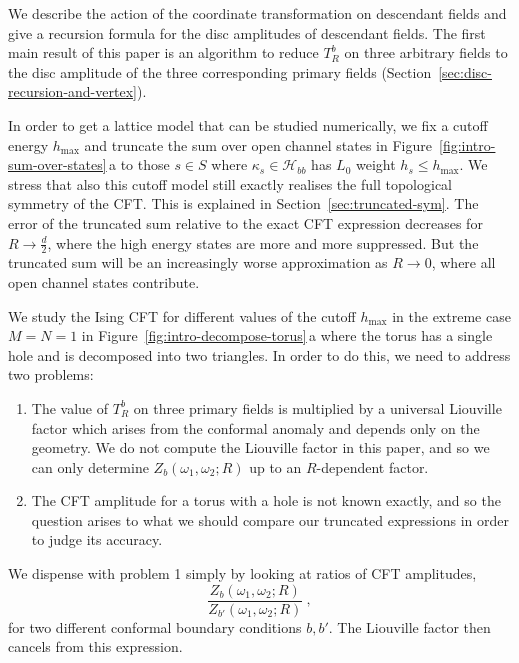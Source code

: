 \documentclass[11pt,a4paper]{article}
\numberwithin{equation}{section}
\begin{document}
We describe the action of the coordinate transformation on descendant fields and 
give a recursion formula for the disc amplitudes of descendant fields. The first main result of this paper is an algorithm to reduce $T^b_R$ on three arbitrary fields to the disc amplitude of the three corresponding primary fields (Section~\ref{sec:disc-recursion-and-vertex}).

\medskip

In order to get a lattice model that can be studied numerically, we fix a cutoff energy $h_\mathrm{max}$ and truncate the sum over open channel states in Figure~\ref{fig:intro-sum-over-states}\,a to those $s \in S$ where $\kappa_s \in \mathcal{H}_{bb}$ has $L_0$ weight $h_s \le h_\mathrm{max}$. We stress that also this cutoff model still exactly realises the full topological symmetry of the CFT. This is explained in Section~\ref{sec:truncated-sym}.
The error of the truncated sum relative to the exact CFT expression decreases for $R \to \frac d2$, where the high energy states are more and more suppressed. 
But the truncated sum will be an increasingly worse approximation as $R \to 0$, where all open channel states contribute.

We study the Ising CFT for different values of the cutoff $h_\mathrm{max}$ in the extreme case $M=N=1$ in Figure~\ref{fig:intro-decompose-torus}\,a where the torus has a single hole and is decomposed into two triangles. In order to do this, we need to address two problems:
\begin{enumerate}
\item The value of $T^b_R$ on three primary fields is multiplied by a universal Liouville factor which arises from the conformal anomaly and depends only on the geometry. We do not compute the Liouville factor in this paper, and so we can only determine $Z_b(\omega_1,\omega_2;R)$ up to an $R$-dependent factor.
\item The CFT amplitude for a torus with a hole is not known exactly, and so the question arises to what we should compare our truncated expressions in order to judge its accuracy.
\end{enumerate}
We dispense with problem 1 simply by looking at ratios of CFT amplitudes,
\begin{equation}\label{eq:ZZ-ratio}
	\frac{Z_b(\omega_1,\omega_2;R)}{Z_{b'}(\omega_1,\omega_2;R)}~,
\end{equation}
for two different conformal boundary conditions $b,b'$. The Liouville factor then cancels from this expression. 
\end{document}
